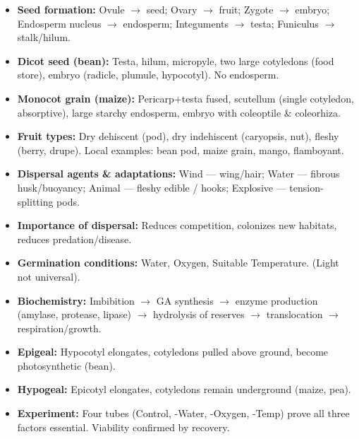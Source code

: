 \documentclass[11pt]{article}
\begin{document}
\begin{aretenir}
\begin{itemize}
\item \textbf{Seed formation:} Ovule $\to$ seed; Ovary $\to$ fruit; Zygote $\to$ embryo; Endosperm nucleus $\to$ endosperm; Integuments $\to$ testa; Funiculus $\to$ stalk/hilum.
\item \textbf{Dicot seed (bean):} Testa, hilum, micropyle, two large cotyledons (food store), embryo (radicle, plumule, hypocotyl). No endosperm.
\item \textbf{Monocot grain (maize):} Pericarp+testa fused, scutellum (single cotyledon, absorptive), large starchy endosperm, embryo with coleoptile \& coleorhiza.
\item \textbf{Fruit types:} Dry dehiscent (pod), dry indehiscent (caryopsis, nut), fleshy (berry, drupe). Local examples: bean pod, maize grain, mango, flamboyant.
\item \textbf{Dispersal agents \& adaptations:} Wind — wing/hair; Water — fibrous husk/buoyancy; Animal — fleshy edible / hooks; Explosive — tension-splitting pods.
\item \textbf{Importance of dispersal:} Reduces competition, colonizes new habitats, reduces predation/disease.
\item \textbf{Germination conditions:} Water, Oxygen, Suitable Temperature. (Light not universal).
\item \textbf{Biochemistry:} Imbibition $\to$ GA synthesis $\to$ enzyme production (amylase, protease, lipase) $\to$ hydrolysis of reserves $\to$ translocation $\to$ respiration/growth.
\item \textbf{Epigeal:} Hypocotyl elongates, cotyledons pulled above ground, become photosynthetic (bean).
\item \textbf{Hypogeal:} Epicotyl elongates, cotyledons remain underground (maize, pea).
\item \textbf{Experiment:} Four tubes (Control, -Water, -Oxygen, -Temp) prove all three factors essential. Viability confirmed by recovery.
\end{itemize}
\end{aretenir}
\end{document}
